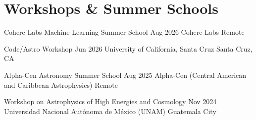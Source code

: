 \section{Workshops \& Summer Schools}

\resumeEduEntry
    {Cohere Labs Machine Learning Summer School}
    {Aug 2026}
    {Cohere Labs}
    {Remote}
    {}

\resumeEduEntry
    {Code/Astro Workshop}
    {Jun 2026}
    {University of California, Santa Cruz}
    {Santa Cruz, CA}
    {}

\resumeEduEntry
    {Alpha-Cen Astronomy Summer School}
    {Aug 2025}
    {Alpha-Cen (Central American and Caribbean Astrophysics)}
    {Remote}
    {}

\resumeEduEntry
    {Workshop on Astrophysics of High Energies and Cosmology}
    {Nov 2024}
    {Universidad Nacional Autónoma de México (UNAM)}
    {Guatemala City}
    {}
